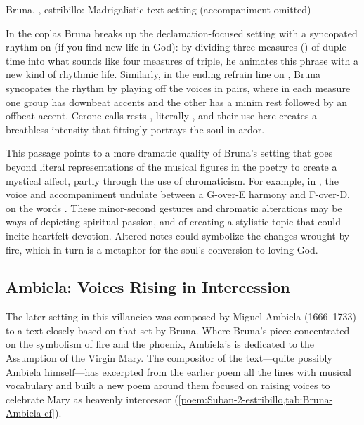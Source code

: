 
{Bruna, , estribillo: Madrigalistic text setting
(accompaniment omitted)}

In the coplas Bruna breaks up the declamation-focused setting with a syncopated
rhythm on  (if you find new life in God):
by dividing three measures () of duple time into what sounds
like four measures of triple, he animates this phrase with a new kind of
rhythmic life. 
Similarly, in the ending refrain line on , Bruna syncopates the
rhythm by playing off the voices in pairs, where in each measure one group has
downbeat accents and the other has a minim rest followed by an offbeat accent.
Cerone calls rests , literally , and their use
here creates a breathless intensity that fittingly portrays the soul in ardor.%
    \Autocite[\XXX]{Cerone:Melopeo}

This passage points to a more dramatic quality of Bruna's setting that goes
beyond literal representations of the musical figures in the poetry to create a
mystical affect, partly through the use of chromaticism.
For example, in , the voice and accompaniment undulate between a
G-over-E\fl{} harmony and F\sh-over-D, on the words .
These minor-second gestures and chromatic alterations may be
ways of depicting spiritual passion, and of creating a stylistic topic that
could incite heartfelt devotion.
Altered notes could symbolize the changes wrought by fire, which in turn is a
metaphor for the soul's conversion to loving God.  

\subsection{Ambiela: Voices Rising in Intercession}

The later setting in this villancico was composed by Miguel Ambiela
(1666--1733) to a text closely based on that set by Bruna.
Where Bruna's piece concentrated on the symbolism of fire and the phoenix,
Ambiela's is dedicated to the Assumption of the Virgin Mary.
The compositor of the text---quite possibly Ambiela himself---has excerpted
from the earlier poem all the lines with musical vocabulary and built a new
poem around them focused on raising voices to celebrate Mary as heavenly
intercessor (\cref{poem:Suban-2-estribillo,tab:Bruna-Ambiela-cf}).

